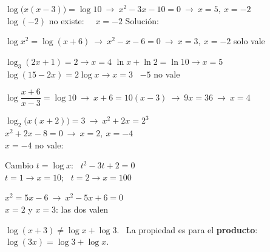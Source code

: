 \documentclass[11pt,a4paper]{article}
\newcommand{\comic}{\fontfamily{ComicNeue-TLF}\selectfont}
\newcommand{\nota}[1]{{\comic\small\color{fmex!85!black}#1}}
\newcommand{\be}[1]{{\color{fmok}\faCheckCircle}\ \ensuremath{#1}}
\newcommand{\mal}[1]{{\color{fmR}\faTimesCircle}\ {\color{fmR}\ensuremath{#1}}}
\begin{document}
\vfill
\begin{exemple}[Ejemplo: \ $\log x+\log(x-3)=1$]
$\log\big(x(x-3)\big)=\log10\ \to\ x^2-3x-10=0\ \to\ x=5,\ x=-2$\\[3pt]
$\log(-2)$ no existe: \ \mal{x=-2} \qquad Solución: 
\end{exemple}

\vfill
\begin{exemple}[Ejemplo: \ $2\log x-\log(x+6)=0$]
$\log x^2=\log(x+6)\ \to\ x^2-x-6=0\ \to\ x=3,\ x=-2$ \qquad solo vale 
\end{exemple}

\vfill
\begin{exemple}[Ejemplos]
$\log_3(2x+1)=2\to x=4$ \quad $\ln x+\ln2=\ln10\to x=5$ \quad $\log(15-2x)=2\log x\to x=3$ \ \nota{$-5$ no vale}
\end{exemple}

\vfill
\begin{exemple}[Ejemplo: \ $\log(x+6)-\log(x-3)=1$]
$\log\dfrac{x+6}{x-3}=\log10\ \to\ x+6=10(x-3)\ \to\ 9x=36\ \to\ \boxed{x=4}$ \ \be{}
\end{exemple}

\vfill
\begin{tcbraster}[raster columns=2,raster equal height,raster column skip=10pt]
\begin{exemple}[Ejemplo: \ $\log_2x+\log_2(x+2)=3$]
$\log_2\big(x(x+2)\big)=3\ \to\ x^2+2x=2^3$\\[3pt]
$x^2+2x-8=0\ \to\ x=2,\ x=-4$\\[3pt]
$x=-4$ no vale: \ 
\end{exemple}
\begin{exemple}[Ejemplo: \ $(\log x)^2-3\log x+2=0$]
Cambio $t=\log x$: \ $t^2-3t+2=0$\\[3pt]
$t=1\to x=10$; \ $t=2\to x=100$\\[3pt]
\end{exemple}
\end{tcbraster}

\vfill
\begin{minipage}[t]{0.5\linewidth}
\begin{exemple}[Ejemplo: \ $2\log x=\log(5x-6)$]
$x^2=5x-6\ \to\ x^2-5x+6=0$\\[3pt]
$x=2$ y $x=3$: las dos valen \be{}
\end{exemple}
\end{minipage}\hfill
\begin{minipage}[t]{0.47\linewidth}
\begin{compte}
$\log(x+3)\neq\log x+\log3$. \ La propiedad es para el \textbf{producto}: \ $\log(3x)=\log3+\log x$.
\end{compte}
\end{minipage}
\end{document}
